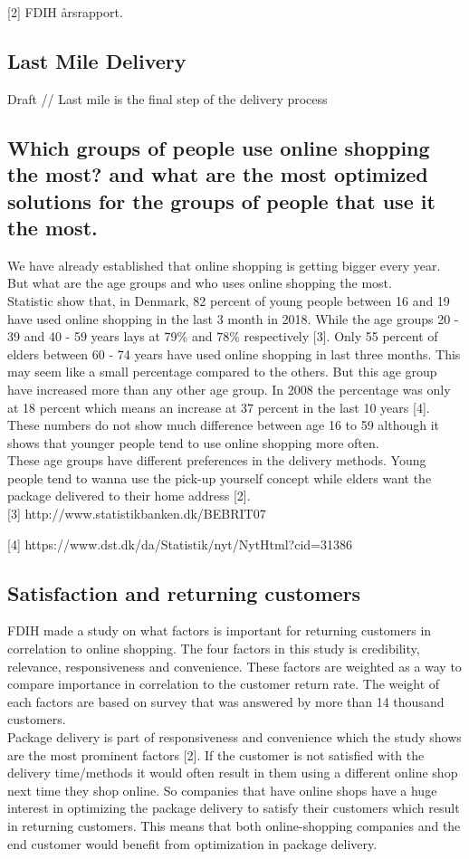 \documentclass[12pt]{report}
\begin{document}
[2] FDIH årsrapport.

\subsection{Last Mile Delivery }
Draft //
Last mile is the final step of the delivery process



\subsection{Which groups of people use online shopping the most? and what are the most optimized solutions for the groups of people that use it the most.}
We have already established that online shopping is getting bigger every year. But what are the age groups and who uses online shopping the most. \\
Statistic show that, in Denmark, 82 percent of young people between 16 and 19 have used online shopping in the last 3 month in 2018. While the age groups 20 - 39 and 40 - 59 years lays at 79\% and 78\% respectively [3]. Only 55 percent of elders between 60 - 74 years have used online shopping in last three months. This may seem like a small percentage compared to the others. But this age group have increased more than any other age group. In 2008 the percentage was only at 18 percent which means an increase at 37 percent in the last 10 years [4]. \\
These numbers do not show much difference between age 16 to 59 although it shows that younger people tend to use online shopping more often. \\
These age groups have different preferences in the delivery methods. Young people tend to wanna use the pick-up yourself concept while elders want the package delivered to their home address [2]. \\

[3] http://www.statistikbanken.dk/BEBRIT07

[4] https://www.dst.dk/da/Statistik/nyt/NytHtml?cid=31386


\subsection{Satisfaction and returning customers}
FDIH made a study on what factors is important for returning customers in correlation to online shopping. The four factors in this study is credibility, relevance, responsiveness and convenience. These factors are weighted as a way to compare importance in correlation to the customer return rate. The weight of each factors are based on survey that was answered by more than 14 thousand customers. \\
Package delivery is part of responsiveness and convenience which the study shows are the most prominent factors [2]. If the customer is not satisfied with the delivery time/methods it would often result in them using a different online shop next time they shop online. So companies that have online shops have a huge interest in optimizing the package delivery to satisfy their customers which result in returning customers. This means that both online-shopping companies and the end customer would benefit from optimization in package delivery.
\end{document}
